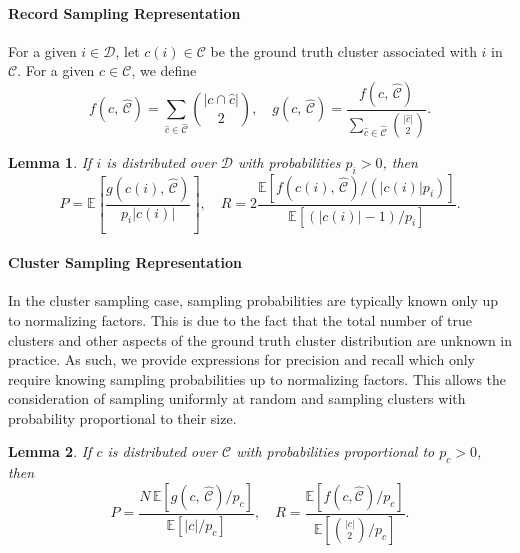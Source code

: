 \documentclass[fontsize=11pt]{article}
\newtheorem{lemma}{Lemma}
\theoremstyle{definition}
\begin{document}
\paragraph{Record Sampling Representation}
For a given $i \in \mathcal{D}$, let $c(i) \in \mathcal{C}$ be the ground truth cluster associated with $i$ in $\mathcal{C}$. For a given $c \in \mathcal{C}$, we define
\begin{equation}
    f(c,\, \widehat{\mathcal{C}}) = \sum_{\hat c \in \hat{\mathcal{C}}} { \lvert c \cap \hat c \rvert \choose 2 }, \quad g(c,\, \widehat{\mathcal{C}}) = \frac{f(c,\, \widehat{\mathcal{C}}) }{\sum_{\hat c \in \hat{\mathcal{C}}} { \lvert \hat c \rvert \choose 2 }}.
\end{equation}
\begin{lemma}\label{lemma:record_sampling_representation}
If $i$ is distributed over $\mathcal{D}$ with probabilities $p_i > 0$, then
\begin{equation}
    P = \mathbb{E} \left[ \frac{g(c(i),\, \widehat{\mathcal{C}})}{p_i \lvert c(i) \rvert} \right], \quad R = 2\frac{\mathbb{E}\left[ f(c(i),\, \widehat{\mathcal{C}})  \big/ (\lvert c(i) \rvert p_i) \right]}{\mathbb{E}\left[ (\lvert c(i) \rvert - 1) / p_i \right]}.
\end{equation}
\end{lemma}

\paragraph{Cluster Sampling Representation}

In the cluster sampling case, sampling probabilities are typically known only up to normalizing factors. This is due to the fact that the total number of true clusters and other aspects of the ground truth cluster distribution are unknown in practice. As such, we provide expressions for precision and recall which only require knowing sampling probabilities up to normalizing factors. This allows the consideration of sampling uniformly at random and sampling clusters with probability proportional to their size. 

\begin{lemma}\label{lemma:cluster_sampling_representation}
If $c$ is distributed over $\mathcal{C}$ with probabilities proportional to $p_c > 0$, then
\begin{equation}\label{eq:lemma_1}
    P = \frac{N\, \mathbb{E} \left[ g(c,\, \widehat{\mathcal{C}})/p_c \right]}{\mathbb{E} \left[ \vert c \rvert /p_c \right]}, \quad R = \frac{\mathbb{E}\left[ f(c, \widehat{\mathcal{C}})/p_c \right]}{\mathbb{E}\left[ {\lvert c \rvert \choose 2}/p_c \right]}.
\end{equation}
\end{lemma}
\end{document}
